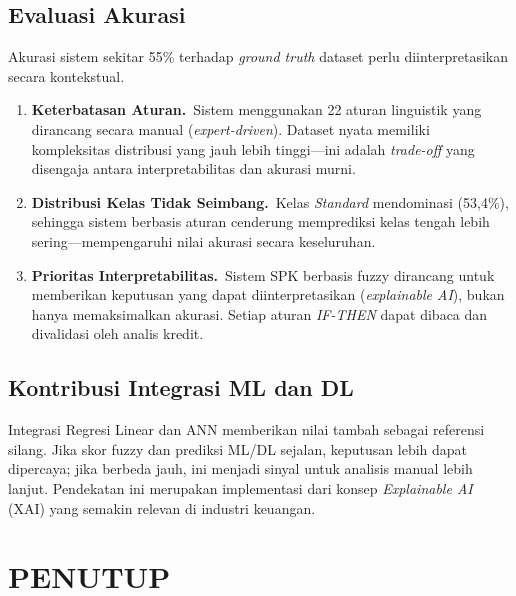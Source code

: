 \documentclass[12pt,a4paper]{report}
\begin{document}
\section{Evaluasi Akurasi}

Akurasi sistem sekitar 55\% terhadap \textit{ground truth}
dataset perlu diinterpretasikan secara kontekstual.

\begin{enumerate}[label=\arabic*.]
  \item \textbf{Keterbatasan Aturan.}\ Sistem menggunakan 22
        aturan linguistik yang dirancang secara manual
        (\textit{expert-driven}). Dataset nyata memiliki
        kompleksitas distribusi yang jauh lebih tinggi—ini
        adalah \textit{trade-off} yang disengaja antara
        interpretabilitas dan akurasi murni.

  \item \textbf{Distribusi Kelas Tidak Seimbang.}\ Kelas
        \textit{Standard} mendominasi (53,4\%), sehingga
        sistem berbasis aturan cenderung memprediksi kelas
        tengah lebih sering—mempengaruhi nilai akurasi secara
        keseluruhan.

  \item \textbf{Prioritas Interpretabilitas.}\ Sistem SPK
        berbasis fuzzy dirancang untuk memberikan keputusan
        yang dapat diinterpretasikan (\textit{explainable
        AI}), bukan hanya memaksimalkan akurasi. Setiap
        aturan \textit{IF-THEN} dapat dibaca dan divalidasi
        oleh analis kredit.
\end{enumerate}

\section{Kontribusi Integrasi ML dan DL}

Integrasi Regresi Linear dan ANN memberikan nilai tambah
sebagai referensi silang. Jika skor fuzzy dan prediksi
ML/DL sejalan, keputusan lebih dapat dipercaya; jika
berbeda jauh, ini menjadi sinyal untuk analisis manual
lebih lanjut. Pendekatan ini merupakan implementasi dari
konsep \textit{Explainable AI} (XAI) yang semakin relevan
di industri keuangan.

\chapter{PENUTUP}
\end{document}
